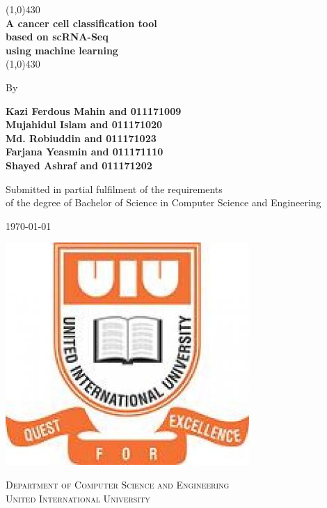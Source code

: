 \begin{titlepage}


\begin{center}
\line(1,0){430}\\
{ \Huge \bf A cancer cell classification tool\\ based on scRNA-Seq \\ using machine learning\\ }
\line(1,0){430}

\end{center}

\vfill

\begin{center}
By
\end{center}

\vfill
\begin{center}
{\large \bf Kazi Ferdous Mahin and 011171009}\\
{\large \bf Mujahidul Islam and 011171020}\\
{\large \bf Md. Robiuddin and 011171023}\\
{\large \bf Farjana Yeasmin and 011171110}\\
{\large \bf Shayed Ashraf and 011171202}\\
\end{center}


\vfill


\begin{center}
{Submitted in partial fulfilment of the requirements \\of the degree of Bachelor of Science in Computer Science and Engineering}
\end{center}

\vfill
\begin{center}
\today
\end{center}

\vfill
	
\begin{center}
\includegraphics[scale=0.15]{./uiu}
\end{center}

\begin{center}
	\textsc{Department of Computer Science and Engineering\\
		United International University}
\end{center}



\end{titlepage}
